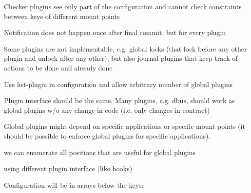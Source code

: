 
\begin{DoxyItemize}
\item Checker plugins see only part of the configuration and cannot check constraints between keys of different mount points
\item Notification does not happen once after final commit, but for every plugin
\item Some plugins are not implementable, e.\+g. global locks (that lock before any other plugin and unlock after any other), but also journal plugins that keep track of actions to be done and already done
\end{DoxyItemize}


\begin{DoxyItemize}
\item Use list-\/plugin in configuration and allow arbitrary number of global plugins
\item Plugin interface should be the same. Many plugins, e.\+g. dbus, should work as global plugins w/o any change in code (i.\+e. only changes in contract)
\item Global plugins might depend on specific applications or specific mount points (it should be possible to enforce global plugins for specific applications).
\end{DoxyItemize}


\begin{DoxyItemize}
\item we can enumerate all positions that are useful for global plugins
\end{DoxyItemize}


\begin{DoxyItemize}
\item using different plugin interface (like hooks)
\end{DoxyItemize}

Configuration will be in arrays below the keys\+:


\begin{DoxyCode}{0}
\end{DoxyCode}


